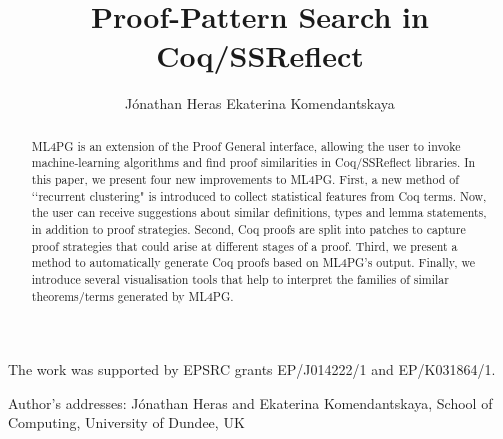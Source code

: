 \documentclass[acmtocl]{acmsmall}
\begin{document}

\title{Proof-Pattern Search in Coq/SSReflect}

%
\author{J\'onathan Heras
Ekaterina Komendantskaya
}




\begin{abstract}
ML4PG is an extension of the Proof General interface, allowing
the user to invoke machine-learning algorithms and find proof similarities
in Coq/SSReflect libraries. In this paper, we present four new improvements to
ML4PG.
First, a new method of \lq\lq{}recurrent clustering" is introduced to collect statistical features from Coq terms.
Now, the user can receive suggestions about similar definitions,
types and lemma statements, in addition to proof strategies. Second, Coq
proofs are split into patches to capture proof strategies that could arise
at different stages of a proof. Third, we present a method to automatically generate Coq proofs based on ML4PG's output. Finally,
we introduce several visualisation tools that help to interpret the families of similar theorems/terms generated by ML4PG.
\end{abstract}




\terms{}





\begin{bottomstuff}
The work was supported by EPSRC grants EP/J014222/1 and EP/K031864/1.

Author's addresses: J\'onathan Heras and Ekaterina Komendantskaya,
School of Computing, University of Dundee, UK
\end{bottomstuff}

\maketitle
\end{document}
